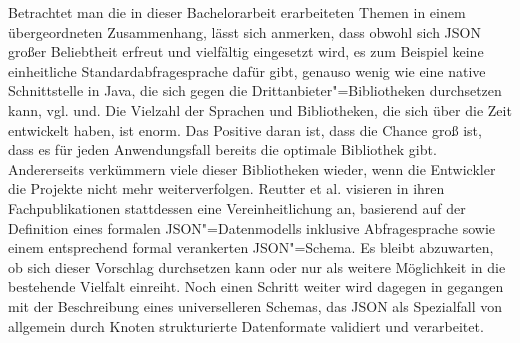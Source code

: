 Betrachtet man die in dieser Bachelorarbeit erarbeiteten Themen in einem übergeordneten Zusammenhang, lässt sich anmerken, dass obwohl sich JSON großer Beliebtheit erfreut und vielfältig eingesetzt wird, es zum Beispiel keine einheitliche Standardabfragesprache dafür gibt, genauso wenig wie eine native Schnittstelle in Java, die sich gegen die Drittanbieter"=Bibliotheken durchsetzen kann, vgl.\nbs\cite{json:libs1} und\nbs\cite{json:libs2}. Die Vielzahl der Sprachen und Bibliotheken, die sich über die Zeit entwickelt haben, ist enorm. Das Positive daran ist, dass die Chance groß ist, dass es für jeden Anwendungsfall bereits die optimale Bibliothek gibt. Andererseits verkümmern viele dieser Bibliotheken wieder, wenn die Entwickler die Projekte nicht mehr weiterverfolgen. Reutter et al. visieren in ihren Fachpublikationen stattdessen eine Vereinheitlichung an, basierend auf der Definition eines formalen JSON"=Datenmodells inklusive Abfragesprache\nbs\cite{jql:dm} sowie einem entsprechend formal verankerten JSON"=Schema\nbs\cite{json:schema:def}. Es bleibt abzuwarten, ob sich dieser Vorschlag durchsetzen kann oder nur als weitere Möglichkeit in die bestehende Vielfalt einreiht. Noch einen Schritt weiter wird dagegen in\nbs\cite{json:ukr} gegangen mit der Beschreibung eines universelleren Schemas, das JSON als Spezialfall von allgemein durch Knoten strukturierte Datenformate validiert und verarbeitet. 















